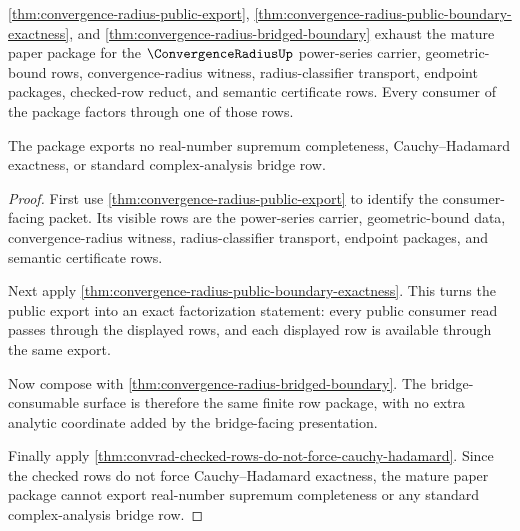 \begin{theorem}
\label{thm:convergence-radius-mature-package-boundary}
\autoref{thm:convergence-radius-public-export},
\autoref{thm:convergence-radius-public-boundary-exactness}, and
\autoref{thm:convergence-radius-bridged-boundary} exhaust the mature paper
package for the $\ConvergenceRadiusUp$ power-series carrier,
geometric-bound rows, convergence-radius witness, radius-classifier
transport, endpoint packages, checked-row reduct, and semantic certificate
rows. Every consumer of the package factors through one of those rows.

The package exports no real-number supremum completeness,
Cauchy--Hadamard exactness, or standard complex-analysis bridge row.
\end{theorem}
\begin{proof}
First use \autoref{thm:convergence-radius-public-export} to identify the
consumer-facing packet. Its visible rows are the power-series carrier,
geometric-bound data, convergence-radius witness, radius-classifier
transport, endpoint packages, and semantic certificate rows.

Next apply \autoref{thm:convergence-radius-public-boundary-exactness}. This
turns the public export into an exact factorization statement: every public
consumer read passes through the displayed rows, and each displayed row is
available through the same export.

Now compose with \autoref{thm:convergence-radius-bridged-boundary}. The
bridge-consumable surface is therefore the same finite row package, with no
extra analytic coordinate added by the bridge-facing presentation.

Finally apply
\autoref{thm:convrad-checked-rows-do-not-force-cauchy-hadamard}. Since the
checked rows do not force Cauchy--Hadamard exactness, the mature paper
package cannot export real-number supremum completeness or any standard
complex-analysis bridge row.
\end{proof}

